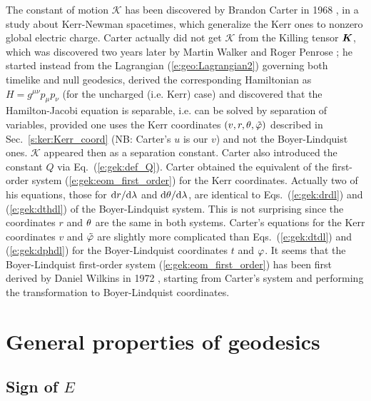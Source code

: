 \begin{hist}
The constant of motion $\mathscr{K}$ has been discovered by Brandon Carter
in 1968 \cite{Carte68}, in a study about  Kerr-Newman spacetimes,
which generalize the Kerr ones to nonzero global electric charge.
Carter actually did not get $\mathscr{K}$ from the Killing tensor $\bm{K}$,
which was discovered two years later by Martin Walker and
Roger Penrose \cite{WalkeP70}; he
started instead from the Lagrangian (\ref{e:geo:Lagrangian2}) governing
both timelike and null geodesics,
derived the corresponding
Hamiltonian as $H = g^{\mu\nu} p_\mu p_\nu$ (for the uncharged (i.e. Kerr) case)
and discovered that the Hamilton-Jacobi equation
is separable, i.e.
can be solved by separation of variables, provided one uses the
Kerr coordinates
$(v,r,\theta,{\tilde\varphi})$ described in Sec.~\ref{s:ker:Kerr_coord}
(NB: Carter's $u$ is our $v$) and not the Boyer-Lindquist ones.
$\mathscr{K}$ appeared then as a separation constant. Carter also introduced
the constant $Q$ via Eq.~(\ref{e:gek:def_Q}). Carter obtained the equivalent
of the first-order system (\ref{e:gek:eom_first_order}) for the Kerr coordinates. Actually
two of his equations, those for $\mathrm{d} r/\mathrm{d}\lambda$ and $\mathrm{d}\theta/\mathrm{d}\lambda$, are
identical to Eqs.~(\ref{e:gek:drdl}) and (\ref{e:gek:dthdl}) of the Boyer-Lindquist
system. This is not surprising since the coordinates
$r$ and $\theta$ are the same in both systems. Carter's equations for the
Kerr coordinates $v$ and ${\tilde\varphi}$ are slightly more complicated than
Eqs.~(\ref{e:gek:dtdl}) and (\ref{e:gek:dphdl}) for the Boyer-Lindquist coordinates
$t$ and $\varphi$. It seems that the Boyer-Lindquist first-order system (\ref{e:gek:eom_first_order})
has been first derived by Daniel Wilkins in 1972 \cite{Wilki72},
starting from Carter's system and performing the transformation to Boyer-Lindquist
coordinates.
\end{hist}

\section{General properties of geodesics}

\subsection{Sign of $E$}

